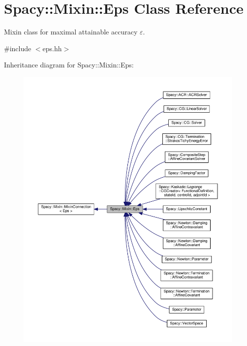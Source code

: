 \hypertarget{classSpacy_1_1Mixin_1_1Eps}{}\section{Spacy\+:\+:Mixin\+:\+:Eps Class Reference}
\label{classSpacy_1_1Mixin_1_1Eps}


Mixin class for maximal attainable accuracy $\varepsilon$.  




{\ttfamily \#include $<$eps.\+hh$>$}



Inheritance diagram for Spacy\+:\+:Mixin\+:\+:Eps\+:
\nopagebreak
\begin{figure}[H]
\begin{center}
\leavevmode
\includegraphics[width=350pt]{classSpacy_1_1Mixin_1_1Eps__inherit__graph}
\end{center}
\end{figure}


